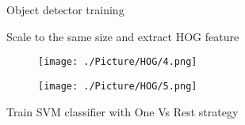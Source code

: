 \documentclass[xcolor=table,compress,blue]{beamer}
\begin{document}
\begin{frame}{Object detector training}
\begin{exampleblock}{Scale to the same size and extract HOG feature}
\begin{figure}[htpb]
			\begin{minipage}[b]{0.8in}
				\centerline{\texttt{[image: ./Picture/HOG/4.png]}}
			\end{minipage}
			\begin{minipage}[b]{0.8in}
				\centerline{\texttt{[image: ./Picture/HOG/5.png]}}
			\end{minipage}
			\label{fig:Models} %
		\end{figure}
	\end{exampleblock}
	\vspace{-16pt}
	\begin{exampleblock}{Train SVM classifier with One Vs Rest strategy} 

	\end{exampleblock}
\end{frame}
 
\end{document}
